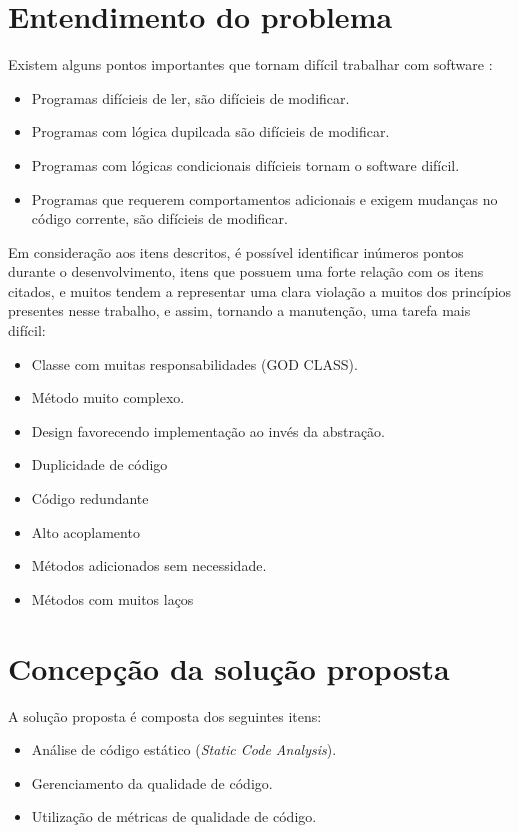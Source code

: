 \documentclass[12pt]{article}
\begin{document}
\part{Entendimento do problema} \label{sec:problema}

Existem alguns pontos importantes que tornam difícil trabalhar com software \cite{MARTIN_FOWLER_REFACTORING}:

\begin{itemize}
 \item Programas difícieis de ler, são difícieis de modificar.
 \item Programas com lógica dupilcada são difícieis de modificar.
 \item Programas com lógicas condicionais difícieis tornam o software difícil.
 \item Programas que requerem comportamentos adicionais e exigem mudanças no código corrente, são difícieis de modificar.
\end{itemize}

Em consideração aos itens descritos, é possível identificar inúmeros pontos durante o desenvolvimento, itens que possuem uma forte relação com os itens citados, e muitos tendem a representar uma clara violação a muitos dos princípios presentes nesse trabalho, e assim, tornando a manutenção, uma tarefa mais difícil:

\begin{itemize}
 \item Classe com muitas responsabilidades (GOD CLASS).
 \item Método muito complexo.
 \item Design favorecendo implementação ao invés da abstração.
 \item Duplicidade de código
 \item Código redundante
 \item Alto acoplamento
 \item Métodos adicionados sem necessidade.
 \item Métodos com muitos laços
\end{itemize}

\part{Concepção da solução proposta} \label{sec:concepcao}

A solução proposta é composta dos seguintes itens:

\begin{itemize}
 \item Análise de código estático (\textit{Static Code Analysis}).
 \item Gerenciamento da qualidade de código.
 \item Utilização de métricas de qualidade de código.
\end{itemize}
\end{document}
